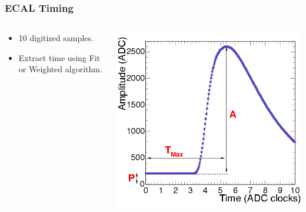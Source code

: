 \documentclass{beamer}
\begin{document}
\begin{frame}
\frametitle{ECAL Timing}
 \begin{minipage}[t]{\linewidth}
       \begin{tcolorbox}[colback=UNL@Cream!5,colframe=UNL@Cream!70,title=\textcolor{UMN@Maroon}{\textbf{Time Reconstruction}}]
   \begin{columns}
    \begin{column}{0.47\linewidth}
         \begin{itemize}
          \item 10 digitized samples.
          \item Extract time using Fit or Weighted algorithm.
         \end{itemize}      
    \end{column}
    \begin{column}{0.55\linewidth}
     \includegraphics[height=0.40\textwidth,width=0.90\linewidth]{THESISPLOTS/Time_Amplitude_Profile.png}
    \end{column} 
   \end{columns}  
 \end{tcolorbox}
 

\end{minipage}
\end{frame}
\end{document}
